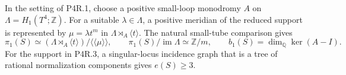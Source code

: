 \begin{proposition}[P4R.4]\hypertarget{tag-02YG}{}\label{night:P4R.4}\label{stmt:P4R.4}

In the setting of P4R.1, choose a positive small-loop
monodromy $A$ on $\Lambda=H_1(T^4;\mathbb Z)$.
For a suitable $\lambda\in\Lambda$, a positive
meridian of the reduced support is represented by
$\mu=\lambda t^m$ in $\Lambda\rtimes_A\langle t\rangle$.
The natural small-tube comparison gives
\[
 \pi_1(S)\simeq
 (\Lambda\rtimes_A\langle t\rangle)/\langle\!\langle\mu\rangle\!\rangle,
 \qquad
 \pi_1(S)/\operatorname{im}\Lambda\simeq\mathbb Z/m,
 \qquad
 b_1(S)=\dim_{\mathbb Q}\ker(A-I).
\]
For the support in P4R.3, a singular-locus incidence
graph that is a tree of rational normalization
components gives $e(S)\ge3$.
\end{proposition}
